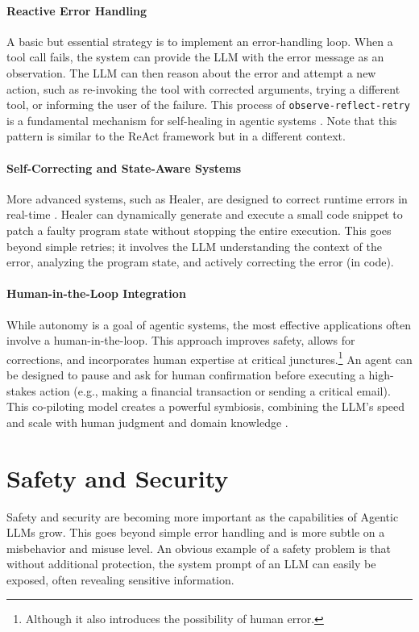 \paragraph{Reactive Error Handling}
A basic but essential strategy is to implement an error-handling loop. When a tool call fails, the system can provide the LLM with the error message as an observation. The LLM can then reason about the error and attempt a new action, such as re-invoking the tool with corrected arguments, trying a different tool, or informing the user of the failure. This process of \texttt{observe-reflect-retry} is a fundamental mechanism for self-healing in agentic systems \citep{sun2024llmruntimeerrorhandler}. Note that this pattern is similar to the ReAct framework but in a different context.

\paragraph{Self-Correcting and State-Aware Systems}
More advanced systems, such as Healer, are designed to correct runtime errors in real-time \citep{wu2024stateflow}. Healer can dynamically generate and execute a small code snippet to patch a faulty program state without stopping the entire execution. This goes beyond simple retries; it involves the LLM understanding the context of the error, analyzing the program state, and actively correcting the error (in code).

\paragraph{Human-in-the-Loop Integration}
While autonomy is a goal of agentic systems, the most effective applications often involve a human-in-the-loop. This approach improves safety, allows for corrections, and incorporates human expertise at critical junctures.\footnote{Although it also introduces the possibility of human error.} An agent can be designed to pause and ask for human confirmation before executing a high-stakes action (e.g., making a financial transaction or sending a critical email). This co-piloting model creates a powerful symbiosis, combining the LLM's speed and scale with human judgment and domain knowledge \citep{mozannar2025magentic}.


\section{Safety and Security}
Safety and security are becoming more important  as the capabilities of Agentic LLMs grow. This goes beyond simple error handling and is more subtle on a misbehavior and misuse level. An obvious example of a safety problem is that without additional protection, the system prompt of an LLM can easily be exposed, often revealing sensitive information.

